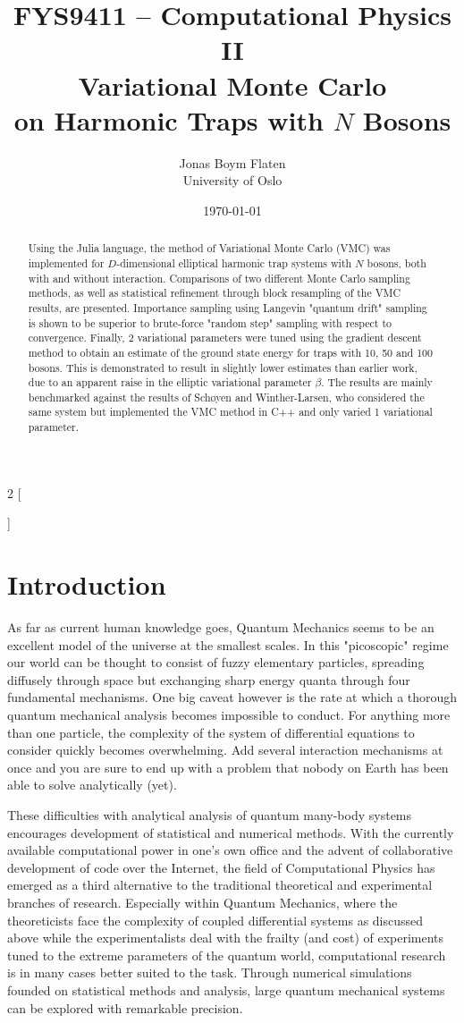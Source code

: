 \documentclass[a4paper,8pt]{article}
\title{\small FYS9411 -- Computational Physics II \\
\Huge Variational Monte Carlo\\\huge on Harmonic Traps with $N$ Bosons}
\author{\large Jonas Boym Flaten \\
\small University of Oslo}
\date{\today}
\begin{document}
\begin{multicols}{2}
[
\maketitle
\begin{abstract}
Using the Julia language, the method of Variational Monte Carlo (VMC) was implemented for $D$-dimensional elliptical harmonic trap systems with $N$ bosons, both with and without interaction. Comparisons of two different Monte Carlo sampling methods, as well as statistical refinement through block resampling of the VMC results, are presented. Importance sampling using Langevin "quantum drift" sampling is shown to be superior to brute-force "random step" sampling with respect to convergence. Finally, 2 variational parameters were tuned using the gradient descent method to obtain an estimate of the ground state energy for traps with 10, 50 and 100 bosons. This is demonstrated to result in slightly lower estimates than earlier work, due to an apparent raise in the elliptic variational parameter $\beta$. The results are mainly benchmarked against the results of Schøyen and Winther-Larsen\cite{SWL}, who considered the same system but implemented the VMC method in C++ and only varied 1 variational parameter.
\end{abstract}
]

\section{Introduction}
As far as current human knowledge goes, Quantum Mechanics seems to be an excellent model of the universe at the smallest scales. In this "picoscopic" regime our world can be thought to consist of fuzzy elementary particles, spreading diffusely through space but exchanging sharp energy quanta through four fundamental mechanisms. One big caveat however is the rate at which a thorough quantum mechanical analysis becomes impossible to conduct. For anything more than one particle, the complexity of the system of differential equations to consider quickly becomes overwhelming. Add several interaction mechanisms at once and you are sure to end up with a problem that nobody on Earth has been able to solve analytically (yet).

These difficulties with analytical analysis of quantum many-body systems encourages development of statistical and numerical methods. With the 
currently available computational power in one's own office and the advent of collaborative development of code over the Internet, the field of Computational Physics has emerged as a third alternative to the traditional theoretical and experimental branches of research. Especially within Quantum Mechanics, where the theoreticists face the complexity of coupled differential systems as discussed above while the experimentalists deal with the frailty (and cost) of experiments tuned to the extreme parameters of the quantum world, computational research is in many cases better suited to the task. Through numerical simulations founded on statistical methods and analysis, large quantum mechanical systems can be explored with remarkable precision.


\end{multicols}
\end{document}
